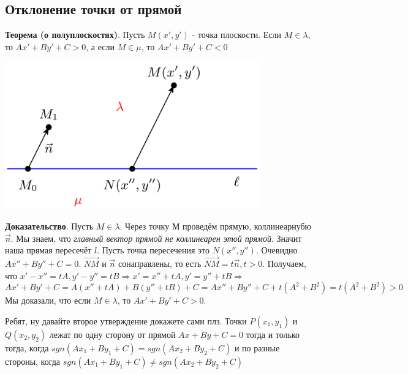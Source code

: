 \documentclass[a4paper]{article}
\begin{document}
    \subsection*{Отклонение точки от прямой}

    \begin{htheorem}
        \textbf{Теорема (о полуплоскостях)}. Пусть $M(x', y')$ - точка плоскости. Если $M \in \lambda$, то $Ax' + By' + C > 0$, а если $M \in \mu $, то $Ax' + By' + C < 0$
    \end{htheorem}



    \includegraphics[width=11cm]{t7}

    \begin{hproof}
        \textbf{Доказательство}. Пусть $M \in \lambda$. Через точку М проведём прямую, коллинеарнубю $\vec{n}$. Мы знаем, что \textit{главный вектор прямой не коллинеарен этой прямой}. Значит наша прямая пересечёт $l$. Пусть точка пересечения это $N(x'', y'')$. Очевидно $Ax'' + By'' + C = 0$. $\overrightarrow{NM}$ и $\vec{n}$ сонаправлены, то есть $\overrightarrow{NM} = t \vec{n}, t>0$. Получаем, что $x' -x'' = tA, y'-y'' = tB \Rightarrow x' = x'' + tA, y' = y'' + tB \Rightarrow$ \newline \begin{equation}
                                                                                                                                                                                                                                                                                                                                                                                                                                                                                                                  Ax' + By' + C = A(x'' + tA) + B(y'' + tB) + C = Ax'' + By'' + C + t(A^2 + B^2) = t(A^2+B^2)>0
        \end{equation}
        Мы доказали, что если $M \in \lambda$, то $Ax' + By' + C > 0$.

        Ребят, ну давайте второе утверждение докажете сами плз.
        \newline
        Точки $P(x_1, y_1)$ и $Q(x_2, y_2)$ лежат по одну сторону от прямой $Ax+By+C=0$ тогда и только тогда, когда $sgn (Ax_1+By_1+C) = sgn (Ax_2+By_2+C)$ и по разные стороны, когда $sgn (Ax_1+By_1+C) \neq sgn (Ax_2+By_2+C)$
    \end{hproof}
\end{document}
